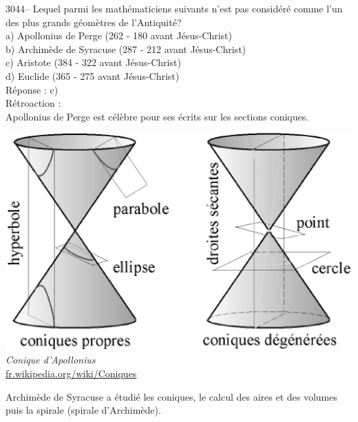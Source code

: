 \documentclass[letterpaper, 12pt]{article}
\begin{document}
3044-- Lequel parmi les math\'ematiciens suivants n'est pas consid\'er\'e comme l'un des plus grands g\'eom\`etres de l'Antiquit\'e?\\

a) Apollonius de Perge (262 - 180 avant J\'esus-Christ)\\
b) Archim\`ede de Syracuse (287 - 212 avant J\'esus-Christ)\\
c) Aristote (384 - 322 avant J\'esus-Christ)\\
d) Euclide (365 - 275 avant J\'esus-Christ)\\

R\'eponse : c)\\

R\'etroaction :\\
Apollonius de Perge est c\'el\`ebre pour ses \'ecrits sur les sections coniques.\\
\begin{center}
\includegraphics[scale=0.25]{Coniques.eps}\\
\emph{{\small Conique d'Apollonius}}\\
\href{http://fr.wikipedia.org/wiki/Coniques}{fr.wikipedia.org/wiki/Coniques}\\
\end{center}
Archim\`ede de Syracuse a \'etudi\'e les coniques, le calcul des aires et des volumes puis la spirale (spirale d'Archim\`ede).\\
\end{document}
